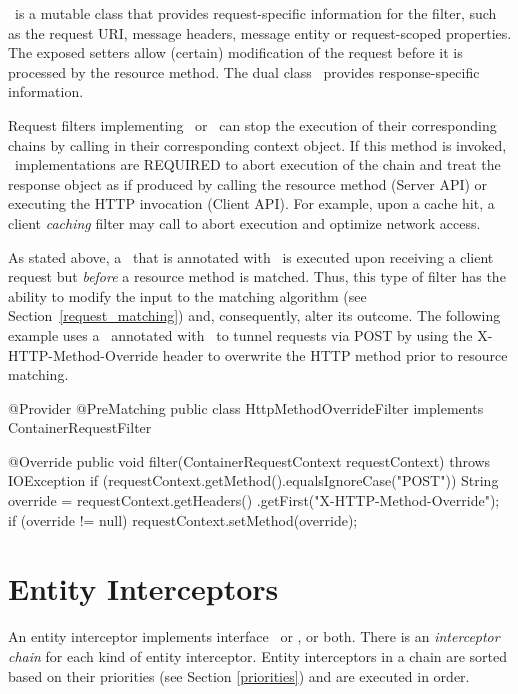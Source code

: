 \ContainerRequestContext\ is a mutable class that provides request-specific information for the filter, such as the request URI, message headers, message entity or request-scoped properties. The exposed setters allow (certain) modification of the request before it is processed by the resource method. The dual class \ContainerResponseContext\ provides response-specific information.

Request filters implementing \ClientRequestFilter\ or \ContainerRequestFilter\ can stop the execution of their corresponding chains by calling  in their corresponding context object. If this method is invoked, \jaxrs\ implementations are REQUIRED to abort execution of the chain and treat the response object as if produced by calling the resource method (Server API) or executing the HTTP invocation (Client API). For example, upon a cache hit, a client {\em caching} filter may call  to abort execution and optimize network access.

As stated above, a \ContainerRequestFilter\ that is annotated with \PreMatching\ is executed upon receiving a client request but {\em before} a resource method is matched. Thus, this type of filter has the ability to modify the input to the matching algorithm (see Section~\ref{request_matching}) and, consequently, alter its outcome. 
The following example uses a \ContainerRequestFilter\ annotated with \PreMatching\ to tunnel requests via POST by using the X-HTTP-Method-Override header to overwrite the HTTP method prior to resource matching.

\begin{listing}{1}
@Provider
@PreMatching
public class HttpMethodOverrideFilter implements ContainerRequestFilter {

    @Override
    public void filter(ContainerRequestContext requestContext) 
        throws IOException {
        if (requestContext.getMethod().equalsIgnoreCase("POST")) {
            String override = requestContext.getHeaders()
                .getFirst("X-HTTP-Method-Override");
            if (override != null) {
                requestContext.setMethod(override);
            }
        }
    }
}
\end{listing}

\section{Entity Interceptors}
\label{entity_interceptors}

An entity interceptor implements interface \ReaderInterceptor\ or \WriterInterceptor, or both. There is an \emph{interceptor chain} for each kind of entity interceptor. Entity interceptors in a chain are sorted based on their priorities (see Section \ref{priorities}) and are executed in order. 

